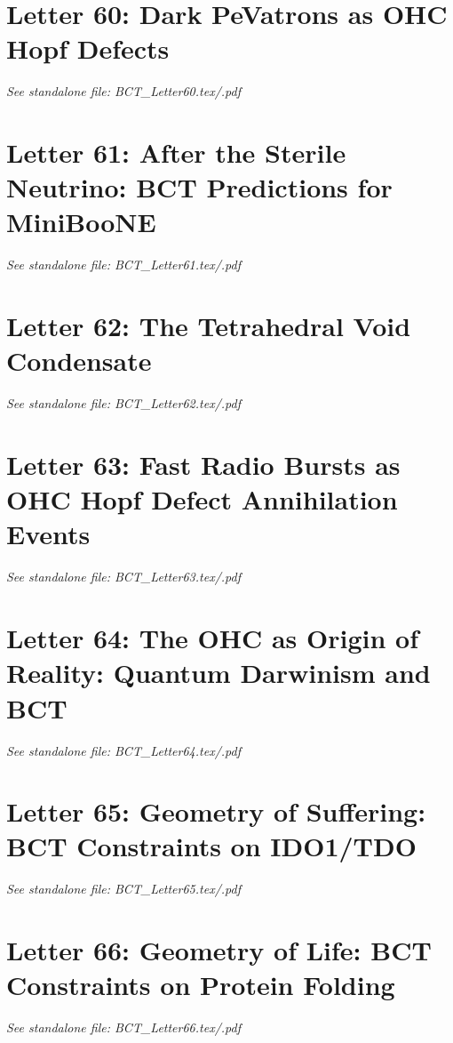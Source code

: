 \documentclass[aps,preprint,superscriptaddress,floatfix]{revtex4-2}
\begin{document}
\newpage
\section*{Letter 60: Dark PeVatrons as OHC Hopf Defects}
\textit{See standalone file: BCT\_Letter60.tex/.pdf}

\newpage
\section*{Letter 61: After the Sterile Neutrino: BCT Predictions for MiniBooNE}
\textit{See standalone file: BCT\_Letter61.tex/.pdf}

\newpage
\section*{Letter 62: The Tetrahedral Void Condensate}
\textit{See standalone file: BCT\_Letter62.tex/.pdf}

\newpage
\section*{Letter 63: Fast Radio Bursts as OHC Hopf Defect Annihilation Events}
\textit{See standalone file: BCT\_Letter63.tex/.pdf}

\newpage
\section*{Letter 64: The OHC as Origin of Reality: Quantum Darwinism and BCT}
\textit{See standalone file: BCT\_Letter64.tex/.pdf}

\newpage
\section*{Letter 65: Geometry of Suffering: BCT Constraints on IDO1/TDO}
\textit{See standalone file: BCT\_Letter65.tex/.pdf}

\newpage
\section*{Letter 66: Geometry of Life: BCT Constraints on Protein Folding}
\textit{See standalone file: BCT\_Letter66.tex/.pdf}
\end{document}
